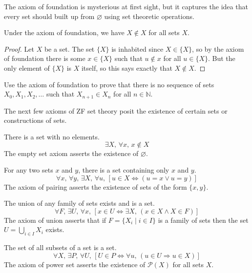 The axiom of foundation is mysterious at first sight, but it captures the idea that every set should built up from $\varnothing$ using set theoretic operations.

\begin{lemma}
Under the axiom of foundation, we have $X \not \in X$ for all sets $X$.
\end{lemma}

\begin{proof}
Let $X$ be a set. The set $\{ X \}$ is inhabited since $X \in \{ X \}$, so by the axiom of foundation there is some $x \in \{ X \}$ such that $u \not\in x$ for all $u \in \{ X \}$. But the only element of $\{ X \}$ is $X$ itself, so this says exactly that $X \not\in X$.
\end{proof}

\begin{exercise}
\label{exStrictlyDecreasingSequenceOfSets}
Use the axiom of foundation to prove that there is no sequence of sets $X_0,X_1,X_2,\dots$ such that $X_{n+1} \in X_n$ for all $n \in \mathbb{N}$.
\end{exercise}

The next few axioms of ZF set theory posit the existence of certain sets or constructions of sets.

\begin{axiom}
\label{axZFCEmptySet}
There is a set with no elements.
\[ \exists X,\, \forall x,\, x \not \in X \]
The empty set axiom asserts the existence of $\varnothing$.
\end{axiom}

\begin{axiom}
\label{axZFCPairing}
For any two sets $x$ and $y$, there is a set containing only $x$ and $y$.
\[ \forall x,\, \forall y,\, \exists X,\, \forall u,\, [u \in X \Leftrightarrow (u=x \vee u=y)] \]
The axiom of pairing asserts the existence of sets of the form $\{ x, y \}$.
\end{axiom}

\begin{axiom}
\label{axZFCUnion}
The union of any family of sets exists and is a set.
\[ \forall F,\, \exists U,\, \forall x,\, [x \in U \Leftrightarrow \exists X,\, (x \in X \wedge X \in F)] \]
The axiom of union asserts that if $F = \{ X_i \mid i \in I \}$ is a family of sets then the set $U=\bigcup_{i \in I} X_i$ exists.
\end{axiom}

\begin{axiom}
\label{axZFCPowerSet}
The set of all subsets of a set is a set.
\[ \forall X,\, \exists P,\, \forall U,\, [U \in P \Leftrightarrow \forall u,\, (u \in U \Rightarrow u \in X)] \]
The axiom of power set asserts the existence of $\mathcal{P}(X)$ for all sets $X$.
\end{axiom}

